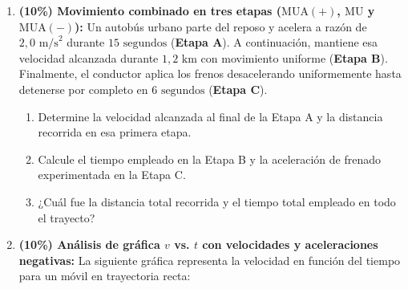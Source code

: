 \documentclass[11pt, letterpaper]{article}
\newif\ifmostrarrespuestas
\newcommand{\respuesta}[1]{
	\ifmostrarrespuestas
	\par\vspace{0.2cm}
	\begin{tcolorbox}[colback=blue!5!white, colframe=valblue, coltext=blue!80!black, boxrule=0.5pt, arc=1mm, left=2mm, right=2mm, top=1.5mm, bottom=1.5mm]
		\footnotesize \textbf{\textcolor{valblue}{Solución Paso a Paso (Docente):}} #1
	\end{tcolorbox}
	\vspace{0.2cm}
	\fi
}
\begin{document}
\begin{enumerate}[leftmargin=*, itemsep=0.6cm]
		\item \textbf{(10\%) Movimiento combinado en tres etapas ($\text{MUA}(+)$, $\text{MU}$ y $\text{MUA}(-)$):} Un autobús urbano parte del reposo y acelera a razón de $2,0\text{ m/s}^2$ durante $15\text{ segundos}$ (\textbf{Etapa A}). A continuación, mantiene esa velocidad alcanzada durante $1,2\text{ km}$ con movimiento uniforme (\textbf{Etapa B}). Finalmente, el conductor aplica los frenos desacelerando uniformemente hasta detenerse por completo en $6\text{ segundos}$ (\textbf{Etapa C}).
		\begin{enumerate}[label=\alph*., itemsep=0.2cm]
			\item Determine la velocidad alcanzada al final de la Etapa A y la distancia recorrida en esa primera etapa.
			\item Calcule el tiempo empleado en la Etapa B y la aceleración de frenado experimentada en la Etapa C.
			\item ¿Cuál fue la distancia total recorrida y el tiempo total empleado en todo el trayecto?
		\end{enumerate}
		\respuesta{
			\textbf{Etapa A ($\text{MUA}(+)$):} $v_{0A}=0$, $a_A=2,0\text{ m/s}^2$, $t_A = 15\text{ s}$.\\
			$v_{fA} = 0 + (2,0)(15) = \mathbf{30}\text{ \textbf{m/s}}$. Distancia A: $x_A = \frac{1}{2}(2,0)(15)^2 = \mathbf{225}\text{ \textbf{m}}$.\\[0.1cm]
			\textbf{Etapa B ($\text{MU}$):} $v_B = 30\text{ m/s}$, $d_B = 1,2\text{ km} = 1200\text{ m}$.\\
			Tiempo B: $t_B = \frac{1200\text{ m}}{30\text{ m/s}} = \mathbf{40}\text{ \textbf{s}}$.\\[0.1cm]
			\textbf{Etapa C ($\text{MUA}(-)$):} $v_{0C} = 30\text{ m/s}$, $v_{fC} = 0$, $t_C = 6\text{ s}$.\\
			Aceleración C: $a_C = \frac{0 - 30}{6} = \mathbf{-5,0}\text{ \textbf{m/s}}^\mathbf{2}$. Distancia C: $x_C = 30(6) + \frac{1}{2}(-5,0)(6)^2 = 180 - 90 = \mathbf{90}\text{ \textbf{m}}$.\\[0.1cm]
			\textbf{Totales:} Distancia total $x_{\text{total}} = 225 + 1200 + 90 = \mathbf{1515}\text{ \textbf{m}}$ \quad | \quad Tiempo total $t_{\text{total}} = 15 + 40 + 6 = \mathbf{61}\text{ \textbf{s}}$.
		}
		
		\item \textbf{(10\%) Análisis de gráfica $v$ vs. $t$ con velocidades y aceleraciones negativas:} La siguiente gráfica representa la velocidad en función del tiempo para un móvil en trayectoria recta:
		

\end{enumerate}
\end{document}
